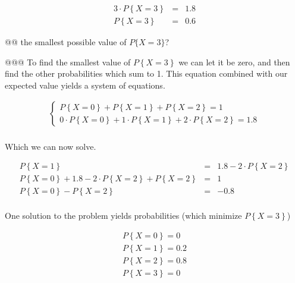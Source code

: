 \documentclass[11pt]{article}\usepackage[]{graphicx}\usepackage[]{xcolor}
\begin{document}
\begin{easylist}[enumerate]
    \begin{equation}
        \begin{aligned}
            3 \cdot P\left\{ X=3 \right\} &=& 1.8\\
            P\left\{ X=3 \right\}&=& 0.6
        \end{aligned}
    \end{equation}

    @@ the smallest possible value of $P\{X = 3\}$?

    @@@ To find the smallest value of $P\left\{ X=3 \right\}$ we can let it be zero, and then find the other
    probabilities which sum to 1. This equation combined with our expected value yields a system of equations.

    \begin{equation}
        \begin{aligned}
            \begin{cases}
                P\left\{ X=0 \right\} +
                P\left\{ X=1 \right\} +
                P\left\{ X=2 \right\} = 1\\
                0 \cdot P\left\{ X=0 \right\} +
                1 \cdot P\left\{ X=1 \right\} +
                2 \cdot P\left\{ X=2 \right\} = 1.8
            \end{cases}\\
        \end{aligned}
    \end{equation}

    Which we can now solve.

    \begin{equation}
        \begin{aligned}
            P\left\{ X=1 \right\} &=& 1.8 - 2 \cdot P\left\{ X=2 \right\}\\
            P\left\{ X=0 \right\} + 1.8 - 2 \cdot P\left\{ X=2 \right\} + P\left\{ X=2 \right\} &=& 1\\
            P\left\{ X=0 \right\} - P\left\{ X=2 \right\} &=& -0.8\\
        \end{aligned}
    \end{equation}

    One solution to the problem yields probabilities (which minimize $P\left\{ X=3 \right\}$)

    \begin{equation}
        \begin{aligned}
            P\left\{ X=0 \right\} = 0\\
            P\left\{ X=1 \right\} = 0.2\\
            P\left\{ X=2 \right\} = 0.8\\
            P\left\{ X=3 \right\} = 0\\
        \end{aligned}
    \end{equation}


\end{easylist}
\end{document}
